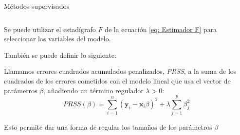 \begin{frame}{Métodos supervisados}
\begin{columns}
\begin{column}{0.9\textwidth}
Se puede utilizar el estadígrafo $F$ de la ecuación \ref{eq: Estimador F} para seleccionar las variables del modelo. 

También se puede definir lo siguiente: 
\begin{defi} 
Llamamos errores cuadrados acumulados penalizados, \emph{PRSS}, a la suma de los cuadrados de los errores cometidos con el modelo lineal que usa el  vector de parámetros $\beta$, añadiendo un término regulador $\lambda >0$: 
\begin{equation}
PRSS(\beta)=\sum_{i=1}^n(\textbf{y}_i-\textbf{x}_i\beta)^2+\lambda\sum_{j=1}^p\beta_j^2
\end{equation}
\end{defi}
Esto permite dar una forma de regular los tamaños de los parámetros $\beta$
\end{column}
\end{columns}
\end{frame}